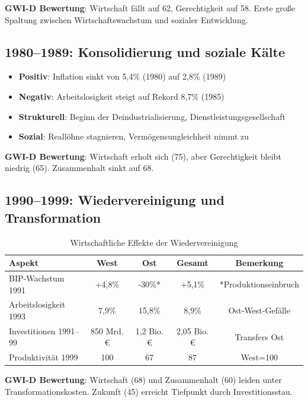 \textbf{GWI-D Bewertung}: Wirtschaft fällt auf 62, Gerechtigkeit auf 58. Erste große Spaltung zwischen Wirtschaftswachstum und sozialer Entwicklung.

\subsection{1980--1989: Konsolidierung und soziale Kälte}

\begin{itemize}
\item \textbf{Positiv}: Inflation sinkt von 5,4\% (1980) auf 2,8\% (1989)
\item \textbf{Negativ}: Arbeitslosigkeit steigt auf Rekord 8,7\% (1985)
\item \textbf{Strukturell}: Beginn der Deindustrialisierung, Dienstleistungsgesellschaft
\item \textbf{Sozial}: Reallöhne stagnieren, Vermögensungleichheit nimmt zu
\end{itemize}

\textbf{GWI-D Bewertung}: Wirtschaft erholt sich (75), aber Gerechtigkeit bleibt niedrig (65). Zusammenhalt sinkt auf 68.

\subsection{1990--1999: Wiedervereinigung und Transformation}

\begin{table}[h]
\centering
\begin{tabular}{lcccc}
\toprule
\textbf{Aspekt} & \textbf{West} & \textbf{Ost} & \textbf{Gesamt} & \textbf{Bemerkung} \\
\midrule
BIP-Wachstum 1991 & +4,8\% & -30\%* & +5,1\% & *Produktionseinbruch \\
Arbeitslosigkeit 1993 & 7,9\% & 15,8\% & 8,9\% & Ost-West-Gefälle \\
Investitionen 1991--99 & 850 Mrd. € & 1,2 Bio. € & 2,05 Bio. € & Transfers Ost \\
Produktivität 1999 & 100 & 67 & 87 & West=100 \\
\bottomrule
\end{tabular}
\caption{Wirtschaftliche Effekte der Wiedervereinigung}
\label{tab:wiedervereinigung-effekte}
\end{table}

\textbf{GWI-D Bewertung}: Wirtschaft (68) und Zusammenhalt (60) leiden unter Transformationskosten. Zukunft (45) erreicht Tiefpunkt durch Investitionsstau.

